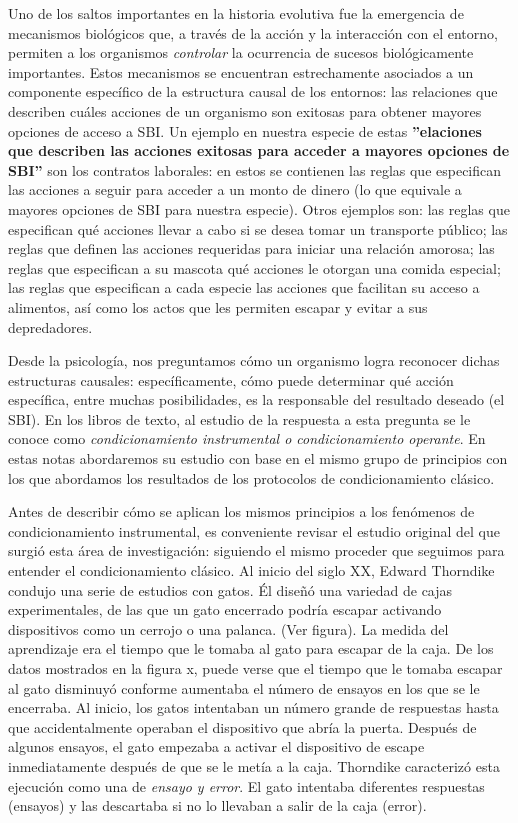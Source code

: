 \documentclass[
  letterpaper,
]{book}
\begin{document}
Uno de los saltos importantes en la historia evolutiva fue la emergencia
de mecanismos biológicos que, a través de la acción y la interacción con
el entorno, permiten a los organismos \emph{controlar} la ocurrencia de
sucesos biológicamente importantes. Estos mecanismos se encuentran
estrechamente asociados a un componente específico de la estructura
causal de los entornos: las relaciones que describen cuáles acciones de
un organismo son exitosas para obtener mayores opciones de acceso a SBI.
Un ejemplo en nuestra especie de estas \textbf{''elaciones que describen
las acciones exitosas para acceder a mayores opciones de SBI''} son los
contratos laborales: en estos se contienen las reglas que especifican
las acciones a seguir para acceder a un monto de dinero (lo que equivale
a mayores opciones de SBI para nuestra especie). Otros ejemplos son: las
reglas que especifican qué acciones llevar a cabo si se desea tomar un
transporte público; las reglas que definen las acciones requeridas para
iniciar una relación amorosa; las reglas que especifican a su mascota
qué acciones le otorgan una comida especial; las reglas que especifican
a cada especie las acciones que facilitan su acceso a alimentos, así
como los actos que les permiten escapar y evitar a sus depredadores.

Desde la psicología, nos preguntamos cómo un organismo logra reconocer
dichas estructuras causales: específicamente, cómo puede determinar qué
acción específica, entre muchas posibilidades, es la responsable del
resultado deseado (el SBI). En los libros de texto, al estudio de la
respuesta a esta pregunta se le conoce como \emph{condicionamiento
instrumental o condicionamiento operante}. En estas notas abordaremos su
estudio con base en el mismo grupo de principios con los que abordamos
los resultados de los protocolos de condicionamiento clásico.

Antes de describir cómo se aplican los mismos principios a los fenómenos
de condicionamiento instrumental, es conveniente revisar el estudio
original del que surgió esta área de investigación: siguiendo el mismo
proceder que seguimos para entender el condicionamiento clásico. Al
inicio del siglo XX, Edward Thorndike condujo una serie de estudios con
gatos. Él diseñó una variedad de cajas experimentales, de las que un
gato encerrado podría escapar activando dispositivos como un cerrojo o
una palanca. (Ver figura). La medida del aprendizaje era el tiempo que
le tomaba al gato para escapar de la caja. De los datos mostrados en la
figura x, puede verse que el tiempo que le tomaba escapar al gato
disminuyó conforme aumentaba el número de ensayos en los que se le
encerraba. Al inicio, los gatos intentaban un número grande de
respuestas hasta que accidentalmente operaban el dispositivo que abría
la puerta. Después de algunos ensayos, el gato empezaba a activar el
dispositivo de escape inmediatamente después de que se le metía a la
caja. Thorndike caracterizó esta ejecución como una de \emph{ensayo y
error}. El gato intentaba diferentes respuestas (ensayos) y las
descartaba si no lo llevaban a salir de la caja (error).
\end{document}

